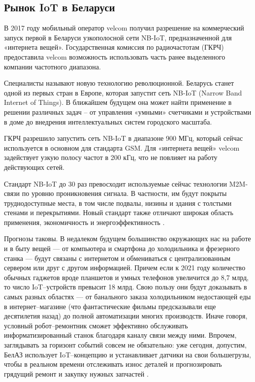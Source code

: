 \subsection{Рынок IoT в Беларуси}
\label{sec:analysis:belarus}

В 2017 году мобильный оператор velcom получил разрешение на коммерческий запуск первой в Беларуси узкополосной сети NB-IoT, предназначенной для «интернета вещей». Государственная комиссия по радиочастотам (ГКРЧ) предоставила velcom возможность использовать часть ранее выделенного компании частотного диапазона.

Специалисты называют новую технологию революционной. Беларусь станет одной из первых стран в Европе, которая запустит сеть NB-IoT (Narrow Band Internet of Things). В ближайшем будущем она может найти применение в решении различных задач – от управления «умными» счетчиками и устройствами в доме до внедрения интеллектуальных систем городского масштаба.

ГКРЧ разрешило запустить сеть NB-IoT в диапазоне 900 МГц, который сейчас используется в основном для стандарта GSM. Для «интернета вещей» velcom задействует узкую полосу частот в 200 кГц, что не повлияет на работу действующих сетей.

Стандарт NB-IoT до 30 раз превосходит используемые сейчас технологии M2M-связи по уровню проникновения сигнала. В частности, им будут покрыты труднодоступные места, в том числе подвалы, низины и здания с толстыми стенами и перекрытиями. Новый стандарт также отличают широкая область применения, экономичность и энергоэффективность \cite{iot_belarus_velcom}.

Прогнозы таковы. В недалеком будущем большинство окружающих нас на работе и в быту вещей — от компьютера и смартфона до холодильника и фрезерного станка — будут связаны с интернетом и обмениваться с централизованным сервером или друг с другом информацией. Причем если к 2021 году количество обычных гаджетов вроде планшетов и умных телефонов увеличится до 8,7 млрд, то число IoT–устройств превысит 18 млрд. Свою пользу они будут доказывать в самых разных областях — от банального заказа холодильником недостающей еды в интернет–магазине (что фантастические фильмы предсказывали еще десятилетия назад) до полной автоматизации многих производств. Иначе говоря, условный робот–ремонтник сможет эффективно обслуживать информатизированный станок благодаря каналу связи между ними. Впрочем, заглядывать за горизонт событий совсем не обязательно: уже сегодня, допустим, БелАЗ использует IoT–концепцию и устанавливает датчики на свои большегрузы, чтобы в реальном времени отслеживать износ деталей и прогнозировать грядущий ремонт и закупку нужных запчастей \cite{iot_belarus_prog}.